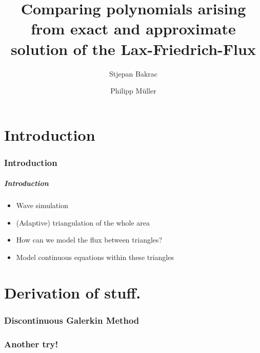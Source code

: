 \documentclass{beamer}
\title{Comparing polynomials arising from exact and approximate solution of the Lax-Friedrich-Flux}
\author{Stjepan Bakrac \and Philipp Müller}
\date{}
\begin{document}
\part{Introduction}
\label{par:introduction-0}

\section{Introduction}
\label{sec:introduction-0}

\begin{frame}
  \frametitle{Introduction}
  \begin{itemize}
  \item Wave simulation
  \item (Adaptive) triangulation of the whole area
  \item How can we model the flux between triangles?
  \item Model continuous equations within these triangles
  \end{itemize}
\end{frame}

\part{Derivation of stuff.}
\label{part:introduction}

\section{Discontinuous Galerkin Method}
\label{sec:basis-functions-intro}

\section{Another try!}
\end{document}
